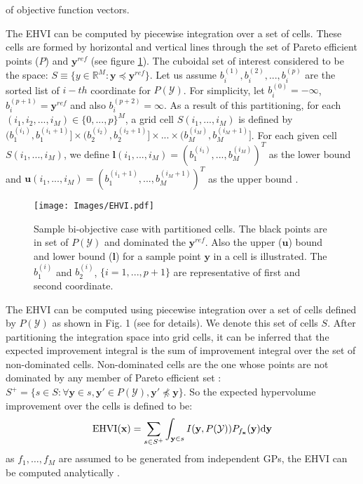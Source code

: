 of objective function vectors.
\par
The EHVI can be computed by piecewise integration over a set of cells. These cells
are formed by horizontal and vertical lines through the set of
Pareto efficient points ($P$) and $\textbf{y}^{ref}$ (see figure \ref{fig:1}).
The cuboidal set of interest considered to be the space: $S \equiv \{y \in
\mathbb{R}^M: \textbf{y} \preceq \textbf{y}^{ref} \}$. Let us assume $b_i^{(1)}, b_i^{(2)},...,b_i^{(p)}$
are the sorted list of $i-th$ coordinate for $P(\mathcal{Y})$. For simplicity, let $b_i^{(0)} = -\infty$,
$b_i^{(p+1)} = \textbf{y}^{ref}$ and also $b_i^{(p+2)} = \infty$. As a result of this partitioning,
for each $(i_1,i_2,..., i_M) \in \{0,...,p\}^M$, a grid cell
$S(i_1,...,i_M)$ is defined by $(b_1^{(i_1)},b_1^{(i_1 + 1)}] \times (b_2^{(i_2)},b_2^{(i_2 + 1)}]
\times ... \times (b_M^{(i_M)},b_M^{(i_M + 1)}]$.
For each given cell $S(i_1,...,i_M)$, we define $\textbf{l}(i_1,...,i_M) = (b_1^{(i_1)},...,b_M^{(i_M)})^T$
as the lower bound and $\textbf{u}(i_1,...,i_M) = (b_1^{(i_1+1)},...,b_M^{(i_M+1)})^T$ as the upper
bound \cite{emmerich2008computation}.
\begin{figure}[h]
\centering
\texttt{[image: Images/EHVI.pdf]}
\caption{Sample bi-objective case with partitioned cells. The black points
are in set of $P(\mathcal{Y})$ and dominated the $\textbf{y}^{ref}$.
Also the upper ($\textbf{u}$) bound and lower bound ($\textbf{l}$) for a sample point $\textbf{y}$
in a cell is illustrated. The $b_1^{(i)}$ and $b_2^{(i)}$, $\{i=1,...,p+1\}$ are
representative of first and second coordinate.}
\label{fig:1}
\end{figure}
\par 
The EHVI can be computed using piecewise integration over a set of
cells defined by $P(\mathcal{Y})$ as shown in Fig. 1 (see \cite{emmerich2008computation} for details).  
We denote this set of cells $S$. After partitioning the integration space into grid cells, it can be inferred that the expected
 improvement integral is the sum of improvement integral over the set of non-dominated cells. Non-dominated cells are the one whose
 points are not dominated by any member of Pareto efficient set \cite{shah2016pareto}:
$S^+ = \{s \in S: \forall \textbf{y} \in s, \textbf{y}' \in P(\mathcal{Y}), \textbf{y}' \npreceq \textbf{y}\}$. So the expected hypervolume
improvement over the cells is defined to be:
\begin{equation}
\begin{aligned}
{\rm EHVI} (\textbf{x}) = \sum_{s \in S^+} \int_{{\textbf y} \in s} I ( {\textbf y},
P (\mathcal{Y}) ) {P}_{{f}_{\textbf{x}}}(\textbf{y}) \mathrm{d}{\textbf y}
  \end{aligned}
\label{eq:3}
\end{equation}
as $f_1, \ldots, f_M$ are assumed to be generated from independent GPs, the EHVI can be computed analytically \cite{emmerich2008computation}.





